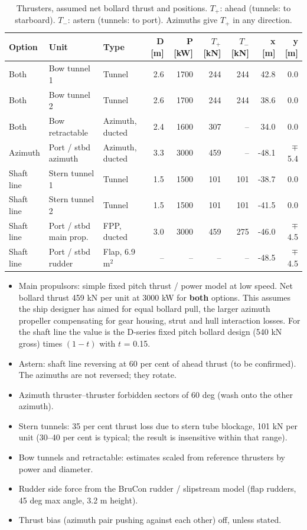 \documentclass[a4paper,11pt]{article}
\begin{document}
\begin{table}[H]
\caption{\label{tab:org125da9b}Thrusters, assumed net bollard thrust and positions.  \(T_+\): ahead (tunnels: to starboard).  \(T_-\): astern (tunnels: to port).  Azimuths give \(T_+\) in any direction.}
\centering
\small
\begin{tabular}{lllrrrrrr}
\toprule
Option & Unit & Type & D [m] & P [kW] & \(T_+\) [kN] & \(T_-\) [kN] & x [m] & y [m]\\[0pt]
\midrule
Both & Bow tunnel 1 & Tunnel & 2.6 & 1700 & 244 & 244 & 42.8 & 0.0\\[0pt]
Both & Bow tunnel 2 & Tunnel & 2.6 & 1700 & 244 & 244 & 38.6 & 0.0\\[0pt]
Both & Bow retractable & Azimuth, ducted & 2.4 & 1600 & 307 & -- & 34.0 & 0.0\\[0pt]
Azimuth & Port / stbd azimuth & Azimuth, ducted & 3.3 & 3000 & 459 & -- & -48.1 & \(\mp\) 5.4\\[0pt]
Shaft line & Stern tunnel 1 & Tunnel & 1.5 & 1500 & 101 & 101 & -38.7 & 0.0\\[0pt]
Shaft line & Stern tunnel 2 & Tunnel & 1.5 & 1500 & 101 & 101 & -41.5 & 0.0\\[0pt]
Shaft line & Port / stbd main prop. & FPP, ducted & 3.0 & 3000 & 459 & 275 & -46.0 & \(\mp\) 4.5\\[0pt]
Shaft line & Port / stbd rudder & Flap, 6.9 m\(^2\) & -- & -- & -- & -- & -48.5 & \(\mp\) 4.5\\[0pt]
\bottomrule
\end{tabular}
\end{table}

\begin{itemize}
\item Main propulsors: simple fixed pitch thrust / power model at low speed.  Net bollard
thrust 459 kN per unit at 3000 kW for \textbf{both} options.  This assumes the ship designer
has aimed for equal bollard pull, the larger azimuth propeller compensating for gear
housing, strut and hull interaction losses.  For the shaft line the value is the
D-series fixed pitch bollard design (540 kN gross) times \((1-t)\) with \(t\) = 0.15.
\item Astern: shaft line reversing at 60 per cent of ahead thrust (to be confirmed).  The
azimuths are not reversed; they rotate.
\item Azimuth thruster--thruster forbidden sectors of 60 deg (wash onto the other azimuth).
\item Stern tunnels: 35 per cent thrust loss due to stern tube blockage, 101 kN per unit
(30--40 per cent is typical; the result is insensitive within that range).
\item Bow tunnels and retractable: estimates scaled from reference thrusters by power and
diameter.
\item Rudder side force from the BruCon rudder / slipstream model (flap rudders, 45 deg
max angle, 3.2 m height).
\item Thrust bias (azimuth pair pushing against each other) off, unless stated.
\end{itemize}
\end{document}
